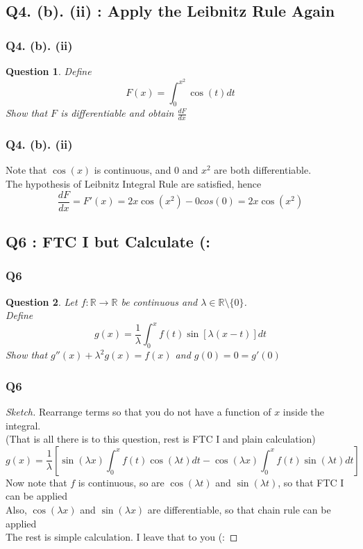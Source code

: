 \documentclass[handout,aspectratio=169]{beamer}
\renewcommand\qedsymbol{$\blacksquare$}
\newtheorem{qsn}{Question}
\newcommand{\bR}{\mathbb{R}}
\begin{document}
\subsection{Q4. (b). (ii) : Apply the Leibnitz Rule Again}

\begin{frame}
\frametitle{Q4. (b). (ii)}
\pause
\begin{qsn}
Define
$$F(x) = \int_{0}^{x^2} \cos(t) dt$$
Show that $F$ is differentiable and obtain $\displaystyle{\frac{dF}{dx}}$
\end{qsn}
\end{frame}

\begin{frame}
\pause
\frametitle{Q4. (b). (ii)}
Note that $\cos(x)$ is continuous, and $0$ and $x^2$ are both differentiable.\\[1mm]\pause
The hypothesis of Leibnitz Integral Rule are satisfied, hence 
$$\frac{dF}{dx} = F'(x) = 2x\cos(x^2) - 0cos(0) = 2x\cos(x^2)$$
\end{frame}

\subsection{Q6 : FTC I but Calculate (:}

\begin{frame}
\frametitle{Q6}
\pause
\begin{qsn}
Let $f:\bR \to \bR$ be continuous and $\lambda \in \bR \setminus \{0\}$.\\ \pause
Define
$$g(x) = \frac{1}{\lambda} \int_0^x f(t) \sin[\lambda(x-t)]dt$$ \pause
Show that $g''(x) + \lambda^2 g(x) = f(x)$ and $g(0) = 0 = g'(0)$
\end{qsn}
\end{frame}

\begin{frame}
\frametitle{Q6}
\begin{proof}[Sketch]
\renewcommand{\qedsymbol}{}
\pause
Rearrange terms so that you do not have a function of $x$ inside the integral.\\ \pause
(That is all there is to this question, rest is FTC I and plain calculation) \pause
$$g(x) = \frac{1}{\lambda}\left[\sin(\lambda x)\int_0^x f(t)\cos(\lambda t)dt - \cos(\lambda x)\int_0^x f(t)\sin(\lambda t)dt\right]$$ \pause
Now note that $f$ is continuous, so are $\cos(\lambda t)$ and $\sin(\lambda t)$, so that FTC I can be applied\\ \pause
Also, $\cos(\lambda x)$ and $\sin(\lambda x)$ are differentiable, so that chain rule can be applied\\ \pause
The rest is simple calculation. I leave that to you (:
\end{proof}
\end{frame}
\end{document}
